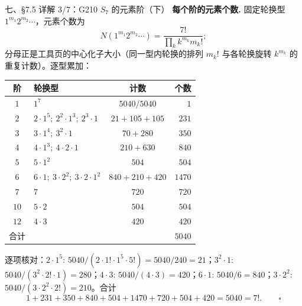 \documentclass[aspectratio=169,10pt,fontset=none]{ctexbeamer}
\newcommand{\key}[1]{\textcolor{ink}{\bfseries #1}}
\begin{document}
\begin{frame}[t]{七、\S7.5 详解 3/7：G210 $S_7$ 的元素阶（下）}
\scriptsize
\setlength{\parskip}{1pt}
\key{每个阶的元素个数.} 固定轮换型 $1^{m_1}2^{m_2}\cdots$，元素个数为
\[ N(1^{m_1}2^{m_2}\cdots)=\frac{7!}{\prod_k k^{m_k}m_k!}; \]
分母正是工具页的中心化子大小（同一型内轮换的排列 $m_k!$ 与各轮换旋转 $k^{m_k}$ 的重复计数）。逐型累加：
\begin{center}
\renewcommand{\arraystretch}{1.08}\setlength{\tabcolsep}{4pt}
\begin{tabular}{@{}c l c r@{}}
\toprule
阶 & 轮换型 & 计数 & 个数\\
\midrule
$1$ & $1^7$ & $5040/5040$ & $1$\\
$2$ & $2\cdot1^5;\ 2^2\cdot1^3;\ 2^3\cdot1$ & $21+105+105$ & $231$\\
$3$ & $3\cdot1^4;\ 3^2\cdot1$ & $70+280$ & $350$\\
$4$ & $4\cdot1^3;\ 4\cdot2\cdot1$ & $210+630$ & $840$\\
$5$ & $5\cdot1^2$ & $504$ & $504$\\
$6$ & $6\cdot1;\ 3\cdot2^2;\ 3\cdot2\cdot1^2$ & $840+210+420$ & $1470$\\
$7$ & $7$ & $720$ & $720$\\
$10$ & $5\cdot2$ & $504$ & $504$\\
$12$ & $4\cdot3$ & $420$ & $420$\\
\midrule
合计 & & & $5040$\\
\bottomrule
\end{tabular}
\end{center}
逐项核对：$2\cdot1^5$: $5040/(2\cdot1!\cdot1^5\cdot5!)=5040/240=21$；$3^2\cdot1$: $5040/(3^2\cdot2!\cdot1)=280$；$4\cdot3$: $5040/(4\cdot3)=420$；$6\cdot1$: $5040/6=840$；$3\cdot2^2$: $5040/(3\cdot2^2\cdot2!)=210$。合计
\[ 1+231+350+840+504+1470+720+504+420=5040=7!.\qquad\square \]
\end{frame}
\end{document}
